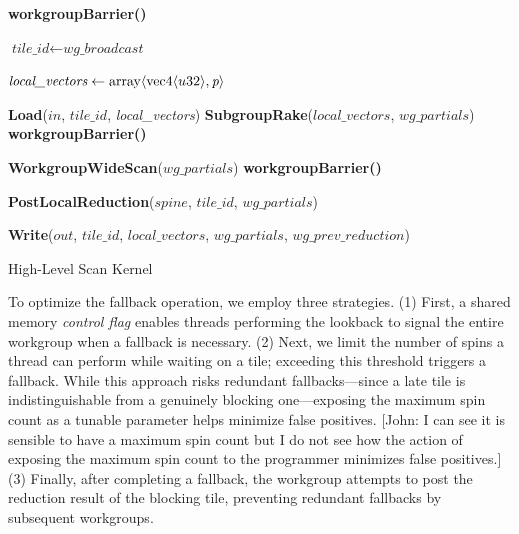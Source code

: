 \documentclass[sigconf]{acmart}
\newcommand{\john}[1]{{\footnotesize\color{cyan}[John: #1]}}
\begin{document}
\begin{algorithm}
  \small
  \SetAlgoLined

  \textbf{workgroupBarrier()}\;

  $\textit{tile\_id} \gets \textit{wg\_broadcast}$\;

  $\textit{local\_vectors} \gets \textnormal{array}\langle \textnormal{vec4}\langle u32\rangle, \textit{p} \rangle$\;

  \textbf{Load}($\textit{in}$, $\textit{tile\_id}$, \textit{local\_vectors})\;
  \textbf{SubgroupRake}($\textit{local\_vectors}$, $\textit{wg\_partials}$)\;
  \textbf{workgroupBarrier()}\;

  \textbf{WorkgroupWideScan}($\textit{wg\_partials}$)\;
  \textbf{workgroupBarrier()}\;

  \textbf{PostLocalReduction}($\textit{spine}$, $\textit{tile\_id}$, $\textit{wg\_partials}$)\;

  \textbf{Write}($\textit{out}$, $\textit{tile\_id}$, $\textit{local\_vectors}$, $\textit{wg\_partials}$, $\textit{wg\_prev\_reduction}$)\;

  \caption{High-Level Scan Kernel}
\end{algorithm}

To optimize the fallback operation, we employ three strategies. (1) First, a shared memory \emph{control flag} enables threads performing the lookback to signal the entire workgroup when a fallback is necessary. (2) Next, we limit the number of spins a thread can perform while waiting on a tile; exceeding this threshold triggers a fallback. While this approach risks redundant fallbacks---since a late tile is indistinguishable from a genuinely blocking one---exposing the maximum spin count as a tunable parameter helps minimize false positives. \john{I can see it is sensible to have a maximum spin count but I do not see how the action of exposing the maximum spin count to the programmer minimizes false positives.} (3) Finally, after completing a fallback, the workgroup attempts to post the reduction result of the blocking tile, preventing redundant fallbacks by subsequent workgroups.
\end{document}
